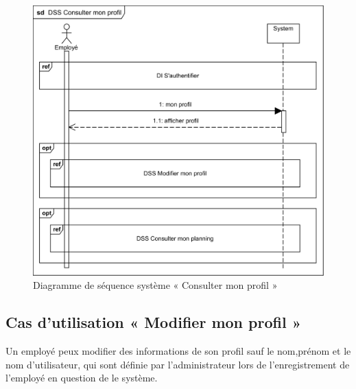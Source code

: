         \begin{figure}[h!]
             \centering
             \includegraphics[scale=1]{images/DSS/DSS Consulter mon profil.png}
             \caption{Diagramme de séquence système « Consulter mon profil »}
             \label{fig4}
        \end{figure}
        
    \subsection*{Cas d'utilisation « Modifier mon profil »}
        Un employé peux modifier des informations de son profil sauf le nom,prénom et le nom d'utilisateur, qui sont définie par l'administrateur lors de l'enregistrement de l'employé en question de le système.
        \clearpage
        

